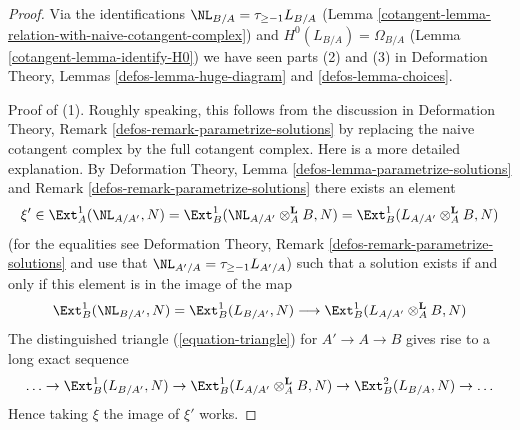 \begin{proof}

Via the identifications $\NL_{B/A} = \tau_{\geq -1}L_{B/A}$
(Lemma \ref{cotangent-lemma-relation-with-naive-cotangent-complex}) and
$H^0(L_{B/A}) = \Omega_{B/A}$ (Lemma \ref{cotangent-lemma-identify-H0})
we have seen parts (2) and (3) in
Deformation Theory, Lemmas \ref{defos-lemma-huge-diagram} and
\ref{defos-lemma-choices}.

\medskip\noindent
Proof of (1). Roughly speaking, this follows from the discussion in
Deformation Theory, Remark \ref{defos-remark-parametrize-solutions}
by replacing the naive cotangent complex by the full cotangent complex.
Here is a more detailed explanation. By
Deformation Theory, Lemma \ref{defos-lemma-parametrize-solutions}
and Remark \ref{defos-remark-parametrize-solutions}
there exists an element
$$
\xi' \in
\Ext^1_A(\NL_{A/A'}, N) =
\Ext^1_B(\NL_{A/A'} \otimes_A^\mathbf{L} B, N) =
\Ext^1_B(L_{A/A'} \otimes_A^\mathbf{L} B, N)
$$
(for the equalities see Deformation Theory, Remark
\ref{defos-remark-parametrize-solutions} and use that
$\NL_{A'/A} = \tau_{\geq -1} L_{A'/A}$)
such that a solution exists if and only if this element is in
the image of the map
$$
\Ext^1_B(\NL_{B/A'}, N) = \Ext^1_B(L_{B/A'}, N)
\longrightarrow
\Ext^1_B(L_{A/A'} \otimes_A^\mathbf{L} B, N)
$$
The distinguished triangle (\ref{equation-triangle})
for $A' \to A \to B$ gives rise to a long exact sequence
$$
\ldots \to
\Ext^1_B(L_{B/A'}, N) \to
\Ext^1_B(L_{A/A'} \otimes_A^\mathbf{L} B, N) \to
\Ext^2_B(L_{B/A}, N) \to \ldots
$$
Hence taking $\xi$ the image of $\xi'$ works.
\end{proof}

